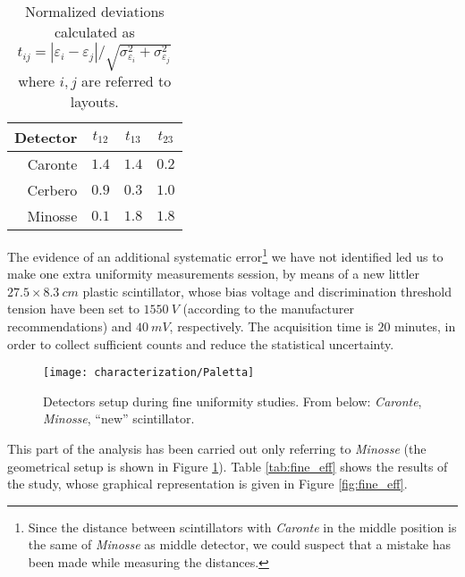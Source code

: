 \begin{table}[!hbt]
	\centering
	\begin{tabular}{r|ccc}
		\toprule
		Detector&$t_{12}$&$t_{13}$&$t_{23}$\\
		\midrule
		Caronte &$1.4$ & $1.4$ & $0.2$\\
		Cerbero &$0.9$ & $0.3$ & $1.0$\\
		Minosse &$0.1$ & $1.8$ & $1.8$\\
		\bottomrule	
	\end{tabular}
	\caption{Normalized deviations calculated as $t_{ij}=\left|\varepsilon_{i}-\varepsilon_{j}\right|/\sqrt{\sigma_{\varepsilon_{i}}^2+\sigma_{\varepsilon_{j}}^2}$ where $i,j$ are referred to layouts.}\label{tab:norm_dev}
\end{table}

The evidence of an additional systematic error\footnote{Since the distance between scintillators with \emph{Caronte} in the middle position is the same of \emph{Minosse} as middle detector, we could suspect that a mistake has been made while measuring the distances.} we have not identified led us to make one extra uniformity measurements session, by means of a new littler $27.5\times \SI{8.3}{cm}$ plastic scintillator, whose bias voltage and discrimination threshold tension have been set to $\SI{1550}{V}$ (according to the manufacturer recommendations) and $\SI{40}{mV}$, respectively. The acquisition time is $20$ minutes, in order to collect sufficient counts and reduce the statistical uncertainty.
\begin{figure}[!htb]
	\centering
	\texttt{[image: characterization/Paletta]}
	\caption{Detectors setup during fine uniformity studies. From below: \emph{Caronte}, \emph{Minosse}, ``new'' scintillator.} \label{fig:fine_unif}
\end{figure}

This part of the analysis has been carried out only referring to \emph{Minosse} (the geometrical setup is shown in Figure \ref{fig:fine_unif}). Table \ref{tab:fine_eff} shows the results of the study, whose graphical representation is given in Figure \ref{fig:fine_eff}.\\

